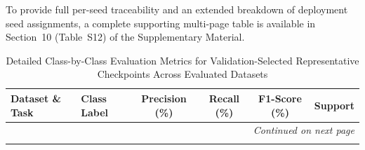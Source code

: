 \documentclass[a4paper,fleqn]{cas-sc}
\begin{document}
To provide full per-seed traceability and an extended breakdown of deployment seed assignments, a complete supporting multi-page table is available in Section~10 (Table~S12) of the Supplementary Material.

{\footnotesize
\begin{longtable}{llcccr}
\caption{Detailed Class-by-Class Evaluation Metrics for Validation-Selected Representative Checkpoints Across Evaluated Datasets} \label{tab:detailed_class_performance} \\
\toprule
\textbf{Dataset \& Task} & \textbf{Class Label} & \textbf{Precision} (\%) & \textbf{Recall} (\%) & \textbf{F1-Score} (\%) & \textbf{Support} \\
\midrule
\endhead

\midrule
\multicolumn{6}{r}{\textit{Continued on next page}} \\
\endfoot

\bottomrule
\endlastfoot


\end{longtable}}
\end{document}
